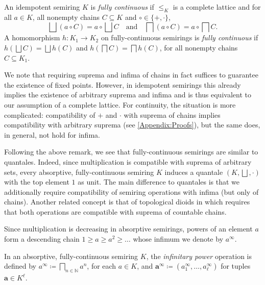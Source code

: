 \documentclass[english,runningheads,a4paper,envcountsame]{llncs}
\newenvironment{Definition}{\definition\upshape}{\enddefinition}
\newcommand{\Inf}{\bigsqcap}
\newcommand{\Sup}{\bigsqcup}
\newcommand{\Nat}{\mathbb{N}}
\newcommand*{\co}{\colon}
\newcommand*{\tup}[1]{\mathbf{#1}}
\begin{document}
\begin{Definition}
An idempotent semiring $K$ is \emph{fully continuous} if $\le_K$ is a complete lattice and for all $a \in K$, all nonempty chains $C \subseteq K$ and $\circ \in \{+,\cdot\}$,
\[
    \Sup (a \circ C) = a \circ \Sup C
    \quad \text{and} \quad
    \Inf (a \circ C) = a \circ \Inf C.    
\]
A homomorphism $h \co K_1 \to K_2$ on fully-continuous semirings is \emph{fully continuous} if $h(\Sup C) = \Sup h(C)$ and $h(\Inf C) = \Inf h(C)$, for all nonempty chains $C \subseteq K_1$.
\end{Definition}

\begin{remark}\label{remarkContinuitySets}
We note that requiring suprema and infima of chains in fact suffices to guarantee the existence of fixed points.
However, in idempotent semirings this already implies the existence of arbitrary suprema and infima \cite{DannertGraNaaTan21} and is thus equivalent to our assumption of a complete lattice.
%
For continuity, the situation is more complicated:
compatibility of $+$ and $\cdot$ with suprema of chains implies compatibility with arbitrary suprema (see \cref{Appendix:Proofs}), but the same does, in general, not hold for infima.
\end{remark}

Following the above remark, we see that fully-continuous semirings are similar to quantales.
Indeed, since multiplication is compatible with suprema of arbitrary sets, every absorptive, fully-continuous semiring $K$ induces a quantale $(K, \Sup, \cdot)$ with the top element $1$ as unit.
The main difference to quantales is that we additionally require compatibility of semiring operations with infima (but only of chains).
Another related concept is that of topological dioids in \cite{GondranMinoux08} which requires that both operations are compatible with suprema of countable chains.

Since multiplication is decreasing in absorptive semirings,
powers of an element $a$ form a descending chain $1 \ge a \ge a^2 \ge \dots$ whose infimum we denote by $a^\infty$.

\begin{Definition}\label{defInfpow}
In an absorptive, fully-continuous semiring $K$, the \emph{infinitary power} operation is defined by
$a^\infty \coloneqq \Inf_{n \in \Nat} a^n$, for each $a \in K$,
and $\tup a^\infty \coloneqq (a_1^\infty,\dots,a_\ell^\infty)$ for tuples $\tup a \in K^\ell$.
\end{Definition}
\end{document}
